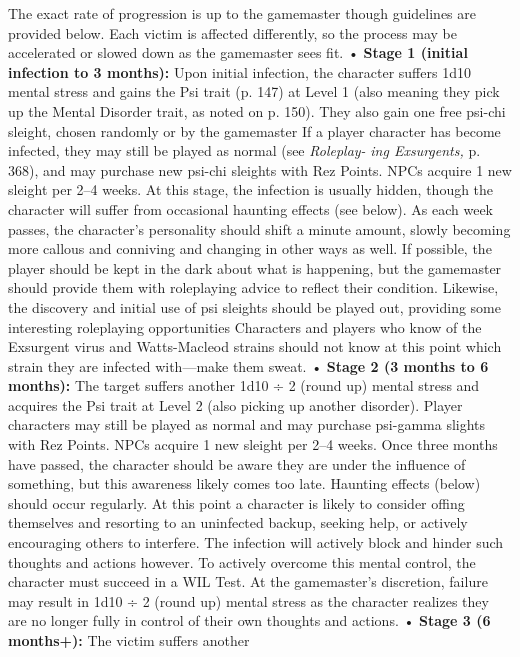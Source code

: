 The exact rate of progression is up to the gamemaster
though guidelines are provided below. Each victim
is affected differently, so the process may be accelerated 
or slowed down as the gamemaster sees fit.
• \textbf{Stage 1 (initial infection to 3 months):} Upon initial
infection, the character suffers 1d10 mental
stress and gains the Psi trait (p. 147) at Level 1 
(also meaning they pick up the Mental Disorder 
trait, as noted on p. 150). They also gain one free 
psi-chi sleight, chosen randomly or by the gamemaster
If a player character has become infected,
they may still be played as normal (see \textit{Roleplay-}
\textit{ing Exsurgents,} p. 368), and may purchase new 
psi-chi sleights with Rez Points. NPCs acquire 1 
new sleight per 2–4 weeks.
  At this stage, the infection is usually hidden, 
though the character will suffer from occasional 
haunting effects (see below). As each week passes, 
the character's personality should shift a minute 
amount, slowly becoming more callous and conniving
and changing in other ways as well. If
possible, the player should be kept in the dark 
about what is happening, but the gamemaster 
should provide them with roleplaying advice to 
reflect their condition. Likewise, the discovery 
and initial use of psi sleights should be played 
out, providing some interesting roleplaying opportunities
Characters and players who know of
the Exsurgent virus and Watts-Macleod strains 
should not know at this point which strain they 
are infected with—make them sweat.
• \textbf{Stage 2 (3 months to 6 months):} The target suffers
another 1d10 ÷ 2 (round up) mental stress
and acquires the Psi trait at Level 2 (also picking
up another disorder). Player characters may
still be played as normal and may purchase psi-gamma
slights with Rez Points. NPCs acquire 1
new sleight per 2–4 weeks.
  Once three months have passed, the character 
should be aware they are under the influence 
of something, but this awareness likely comes 
too late. Haunting effects (below) should occur 
regularly. At this point a character is likely to 
consider offing themselves and resorting to an 
uninfected backup, seeking help, or actively encouraging
others to interfere. The infection will
actively block and hinder such thoughts and actions
however. To actively overcome this mental
control, the character must succeed in a WIL Test. 
At the gamemaster's discretion, failure may result 
in 1d10 ÷ 2 (round up) mental stress as the character
realizes they are no longer fully in control
of their own thoughts and actions. 
•  \textbf{Stage 3 (6 months+):} The victim suffers another 

